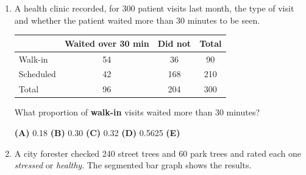 \documentclass[12pt]{article}
\begin{document}
\begin{enumerate}[leftmargin=1.9em, itemsep=0.13in]

  \item A health clinic recorded, for 300 patient visits last month, the type of visit and
        whether the patient waited more than 30 minutes to be seen.

        \vspace{2pt}
        {\centering\small
        \renewcommand{\arraystretch}{1.15}
        \begin{tabular}{@{} l c c c @{}}
        \rowcolor{sky}
         & \textbf{Waited over 30 min} & \textbf{Did not} & \textbf{Total} \\
        \midrule
        Walk-in   & 54 & 36  & 90  \\
        Scheduled & 42 & 168 & 210 \\
        \midrule
        Total     & 96 & 204 & 300 \\
        \end{tabular}\par}
        \vspace{4pt}

        What proportion of \textbf{walk-in} visits waited more than 30 minutes?\hfill{}\rule[-0.2in]{0pt}{0.48in}
        \par\vspace{3pt}\noindent
        \hspace{1.2em}\textbf{(A)} 0.18 \hfill \textbf{(B)} 0.30 \hfill
        \textbf{(C)} 0.32 \hfill \textbf{(D)} 0.5625 \hfill \textbf{(E)} 

  \boxguard[18]%
  \item A city forester checked 240 street trees and 60 park trees and rated each one
        \emph{stressed} or \emph{healthy}. The segmented bar graph shows the results.


\end{enumerate}
\end{document}

